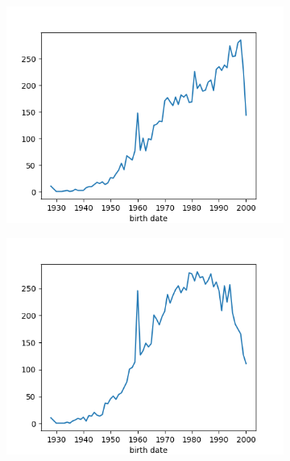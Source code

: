 \begin{figure}[!ht]
    \caption{Birth date histograms.}
    \begin{subfigure}[ht]{.5\linewidth}
        \label{fig:birth-date-hist-original}
        \centering
        \includegraphics[width=\textwidth]{./img/birth-date-freq-original.png}
    \end{subfigure}
    \begin{subfigure}[ht]{.5\linewidth}
        \label{fig:birth-date-hist-new}
        \centering
        \includegraphics[width=\textwidth]{./img/birth-date-freq-new.png}
    \end{subfigure}


\end{figure}
